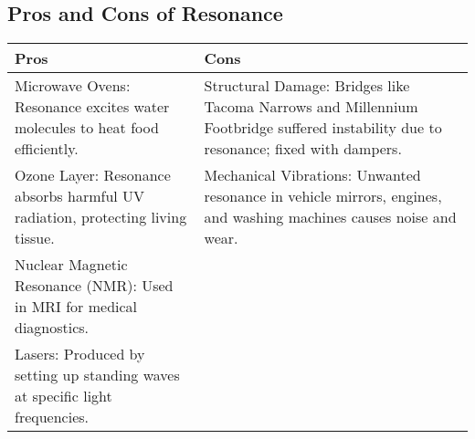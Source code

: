 \documentclass[a4paper,12pt]{article}
\begin{document}
\pagebreak

\subsection{Pros and Cons of Resonance}

\begin{table}[H]
  \centering

  \def\arraystretch{1.1}
  \begin{tabular}{|p{}|p{}|}\hline
    \rowcolor{Magenta!30!white} \textbf{Pros}                                      & \textbf{Cons}                                                                                                                       \\ \hline
    Microwave Ovens: Resonance excites water molecules to heat food efficiently.   & Structural Damage: Bridges like Tacoma Narrows and Millennium Footbridge suffered instability due to resonance; fixed with dampers. \\ \hline
    Ozone Layer: Resonance absorbs harmful UV radiation, protecting living tissue. & Mechanical Vibrations: Unwanted resonance in vehicle mirrors, engines, and washing machines causes noise and wear.                  \\ \hline
    Nuclear Magnetic Resonance (NMR): Used in MRI for medical diagnostics.         &                                                                                                                                     \\ \hline
    Lasers: Produced by setting up standing waves at specific light frequencies.   &                                                                                                                                     \\ \hline
  \end{tabular}
\end{table}
\end{document}
